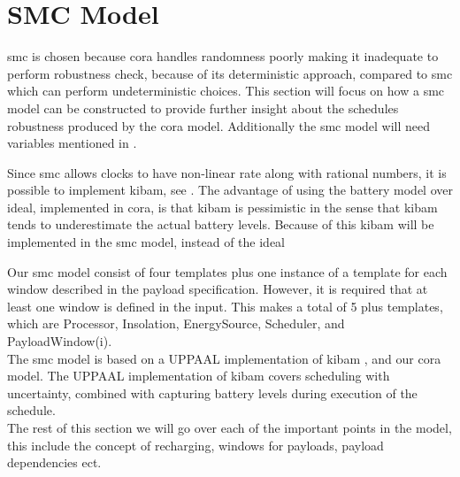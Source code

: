 \section{SMC Model} \label{sec:smc_model}
\Gls{smc} is chosen because \gls{cora} handles randomness poorly making it inadequate to perform robustness check, because of its deterministic approach, compared to \gls{smc} which can perform undeterministic choices. This section will focus on how a \gls{smc} model can be constructed to provide further insight about the schedules robustness produced by the \gls{cora} model. Additionally the \gls{smc} model will need variables mentioned in .

Since \gls{smc} allows clocks to have non-linear rate along with rational numbers, it is possible to implement \gls{kibam}, see . The advantage of using the battery model over ideal, implemented in \gls{cora}, is that \gls{kibam} is pessimistic in the sense that \gls{kibam} tends to underestimate the actual battery levels. Because of this \gls{kibam} will be implemented in the \gls{smc} model, instead of the ideal

Our \gls{smc} model consist of four templates plus one instance of a template for each window described in the payload specification. However, it is required that at least one window is defined in the input. This makes a total of 5 plus templates, which are Processor, Insolation, EnergySource, Scheduler, and PayloadWindow(i).\\ 
The \gls{smc} model is based on a UPPAAL implementation of \gls{kibam} \cite{battery_aware_scheduling}, and our \gls{cora} model. The UPPAAL implementation of \gls{kibam} covers scheduling with uncertainty, combined with capturing battery levels during execution of the schedule. \\
The rest of this section we will go over each of the important points in the model, this include the concept of recharging, windows for payloads, payload dependencies ect. 

